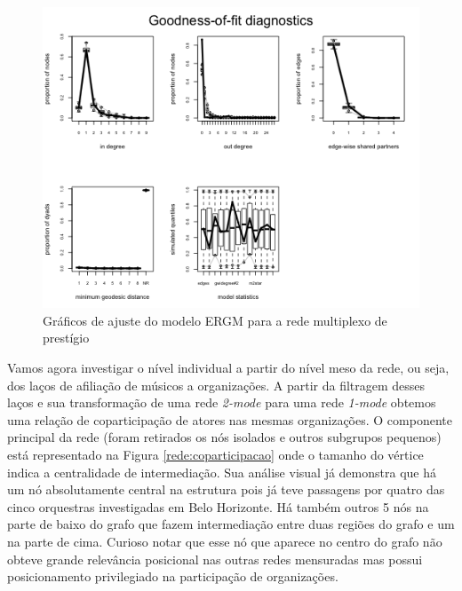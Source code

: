 \documentclass[a4paper, 12pt, openright, oneside, german, french, english, brazil]{abntex2}
\begin{document}
	
	\begin{figure}[!ht]
		\centering
		\caption{Gráficos de ajuste do modelo ERGM para a rede multiplexo de prestígio}
		\label{gof:prestigio}
		\includegraphics[scale=.8]{gof_individuos.png}
	\end{figure}
	
	Vamos agora investigar o nível individual a partir do nível meso da rede, ou seja, dos laços de afiliação de músicos a organizações. A partir da filtragem desses laços e sua transformação de uma rede \textit{2-mode} para uma rede \textit{1-mode} obtemos uma relação de coparticipação de atores nas mesmas organizações. O componente principal da rede (foram retirados os nós isolados e outros subgrupos pequenos) está representado na Figura \ref{rede:coparticipacao} onde o tamanho do vértice indica a centralidade de intermediação. Sua análise visual já demonstra que há um nó absolutamente central na estrutura pois já teve passagens por quatro das cinco orquestras investigadas em Belo Horizonte. Há também outros 5 nós na parte de baixo do grafo que fazem intermediação entre duas regiões do grafo e um na parte de cima. Curioso notar que esse nó que aparece no centro do grafo não obteve grande relevância posicional nas outras redes mensuradas mas possui posicionamento privilegiado na participação de organizações.
	
\end{document}
